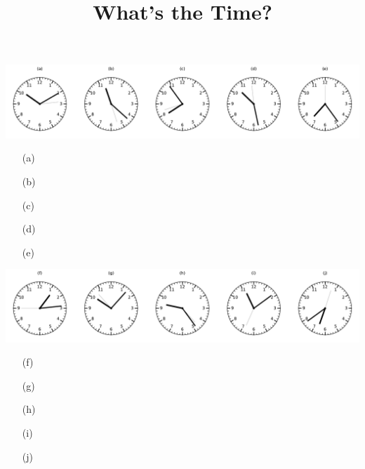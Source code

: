 \documentclass[a4paper, 11pt]{article}
\title{What's the Time?}
\date{}
\author{}
\begin{document}
\maketitle

\includegraphics[width=\textwidth]{clocks_2_0.pdf}
\begin{enumerate}\item[(a)] \dotfill\bigskip
\item[(b)] \dotfill\bigskip
\item[(c)] \dotfill\bigskip
\item[(d)] \dotfill\bigskip
\item[(e)] \dotfill\bigskip
\end{enumerate}\includegraphics[width=\textwidth]{clocks_2_1.pdf}
\begin{enumerate}\item[(f)] \dotfill\bigskip
\item[(g)] \dotfill\bigskip
\item[(h)] \dotfill\bigskip
\item[(i)] \dotfill\bigskip
\item[(j)] \dotfill\bigskip
\end{enumerate}
\end{document}
